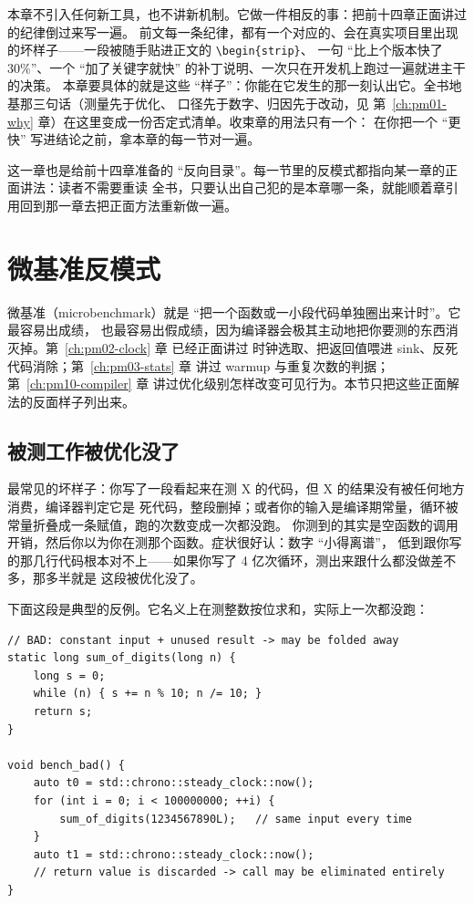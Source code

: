 \documentclass[12pt,a4paper,fontset=fandol]{ctexbook}
\newcommand{\Tp}[1]{\texttt{#1}}
\begin{document}
本章不引入任何新工具，也不讲新机制。它做一件相反的事：把前十四章正面讲过的纪律倒过来写一遍。
前文每一条纪律，都有一个对应的、会在真实项目里出现的坏样子——一段被随手贴进正文的 \Tp{\textbackslash begin\{strip\}}、
一句 ``比上个版本快了 30\%''、一个 ``加了关键字就快'' 的补丁说明、一次只在开发机上跑过一遍就进主干的决策。
本章要具体的就是这些 ``样子''：你能在它发生的那一刻认出它。全书地基那三句话（测量先于优化、
口径先于数字、归因先于改动，见 第~\ref{ch:pm01-why} 章）在这里变成一份否定式清单。收束章的用法只有一个：
在你把一个 ``更快'' 写进结论之前，拿本章的每一节对一遍。

这一章也是给前十四章准备的 ``反向目录''。每一节里的反模式都指向某一章的正面讲法：读者不需要重读
全书，只要认出自己犯的是本章哪一条，就能顺着章引用回到那一章去把正面方法重新做一遍。

\section{微基准反模式}

微基准（microbenchmark）就是 ``把一个函数或一小段代码单独圈出来计时''。它最容易出成绩，
也最容易出假成绩，因为编译器会极其主动地把你要测的东西消灭掉。第~\ref{ch:pm02-clock} 章 已经正面讲过
时钟选取、把返回值喂进 sink、反死代码消除；第~\ref{ch:pm03-stats} 章 讲过 warmup 与重复次数的判据；
第~\ref{ch:pm10-compiler} 章 讲过优化级别怎样改变可见行为。本节只把这些正面解法的反面样子列出来。

\subsection{被测工作被优化没了}

最常见的坏样子：你写了一段看起来在测 X 的代码，但 X 的结果没有被任何地方消费，编译器判定它是
死代码，整段删掉；或者你的输入是编译期常量，循环被常量折叠成一条赋值，跑的次数变成一次都没跑。
你测到的其实是空函数的调用开销，然后你以为你在测那个函数。症状很好认：数字 ``小得离谱''，
低到跟你写的那几行代码根本对不上——如果你写了 4 亿次循环，测出来跟什么都没做差不多，那多半就是
这段被优化没了。

下面这段是典型的反例。它名义上在测整数按位求和，实际上一次都没跑：

\begin{lstlisting}[style=cppstyle, caption={反例：输入是常量、结果没被消费，循环可能被整体删除（示意代码，非本仓库实测）}, label={lst:pm15-badloop}]
// BAD: constant input + unused result -> may be folded away
static long sum_of_digits(long n) {
    long s = 0;
    while (n) { s += n % 10; n /= 10; }
    return s;
}

void bench_bad() {
    auto t0 = std::chrono::steady_clock::now();
    for (int i = 0; i < 100000000; ++i) {
        sum_of_digits(1234567890L);   // same input every time
    }
    auto t1 = std::chrono::steady_clock::now();
    // return value is discarded -> call may be eliminated entirely
}
\end{lstlisting}
\end{document}
